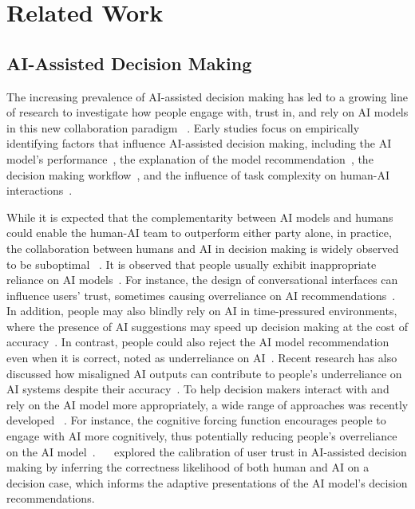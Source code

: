 \section{Related Work}
\label{sec:related}

\subsection{AI-Assisted Decision Making}
The increasing prevalence of AI-assisted decision making has led to a growing line of research to investigate how people engage with, trust in, and rely on AI models in this new collaboration paradigm ~\cite{lai2021towards,chiang2023two,10.1145/3653708}. Early studies focus on empirically identifying factors that influence AI-assisted decision making, including the AI model's performance~\cite{rechkemmer2022confidence}, the explanation of the model recommendation~\cite{schemmer2023appropriate,schoeffer2024explanations,robbemond2022understanding},  the decision making workflow~\cite{chiang2024enhancing,rastogi2022deciding}, and the influence of task complexity on human-AI interactions~\cite{salimzadeh2023missing}.

While it is expected that the complementarity between AI models and humans could enable the human-AI team to outperform either party alone, in practice, the collaboration between humans and AI in decision making is widely observed to be suboptimal ~\cite{schemmer2022should}. It is observed that people usually exhibit inappropriate reliance on AI models~\cite{steyvers2023three}. For instance, the design of conversational interfaces can influence users' trust, sometimes causing overreliance on AI recommendations~\cite{gupta2022trust}. In addition, people may also blindly rely on AI in time-pressured environments, where the presence of AI suggestions may speed up decision making at the cost of accuracy~\cite{swaroop2024accuracy}. In contrast, people could also reject the AI model recommendation even when it is correct, noted as underreliance on AI~\cite{mahmud2022influences,ochmann2020influence,10.1145/3648188.3675130}. Recent research has also discussed how misaligned AI outputs can contribute to people's underreliance on AI systems despite their accuracy~\cite{guerdan2022under}. To help decision makers interact with and rely on the AI model more appropriately, a wide range of approaches was recently developed ~\cite{he2022walking,10.1145/3610219,10.1145/3555572,li2023modeling,lu2023strategic,li2024decoding,lu2024mix}. For instance, the cognitive forcing function encourages people to engage with AI more cognitively, thus potentially reducing people's overreliance on the AI model~\cite{buccinca2021trust,erlei2020impact,lai2021towards,salimzadeh2024dealing}. ~\citeauthor{ma2023should}~\cite{ma2023should} explored the calibration of user trust in AI-assisted decision making by inferring the correctness likelihood of both human and AI on a decision case, which informs the adaptive presentations of the AI model's decision recommendations. 

